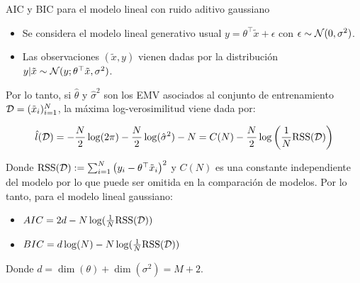 \documentclass[handout, 9pt]{beamer}
\begin{document}
\begin{frame}{AIC y BIC para el modelo lineal con ruido aditivo gaussiano}

\begin{itemize}
	\item Se considera el modelo lineal generativo usual $y = \theta^\top \tilde{x} + \epsilon$ con $\epsilon\sim{\mathcal N}(0,\sigma^2)$.
	\item Las observaciones $(\tilde{x},y)$ vienen dadas por la distribución  $y|\tilde{x} \sim {\mathcal N}(y;\theta^\top \tilde{x},\sigma^2)$.
\end{itemize}

Por lo tanto, si $\hat{\theta}$ y $\hat{\sigma}^2$ son los EMV asociados al conjunto de entrenamiento ${\mathcal D}=(\tilde{x}_i)_{i=1}^N$, la máxima log-verosimilitud viene dada por:

\begin{equation*}
	\hat{l}({\mathcal D}) = -\frac{N}{2}\log(2\pi) - \frac{N}{2}\log(\hat{\sigma}^2) - N = C(N)- \frac{N}{2}\log\left(\frac{1}{N}\text{RSS}({\mathcal D})\right)
\end{equation*}	

Donde $\text{RSS}({\mathcal D}) := \sum_{i=1}^N \left(y_i - \theta^\top \tilde{x}_i\right)^2$ y $C(N)$ es una constante independiente del modelo por lo que puede ser omitida en la comparación de modelos. Por lo tanto, para el modelo lineal gaussiano:

\begin{itemize}
	\item $AIC=2d-N\log(\frac{1}{N}\text{RSS}({\mathcal D}))$
	\item $BIC = d\log(N) - N\log(\frac{1}{N}\text{RSS}({\mathcal D}))$
\end{itemize}

Donde $d=\dim(\theta)+\dim(\sigma^2)=M+2$.

	
\end{frame}
\end{document}
